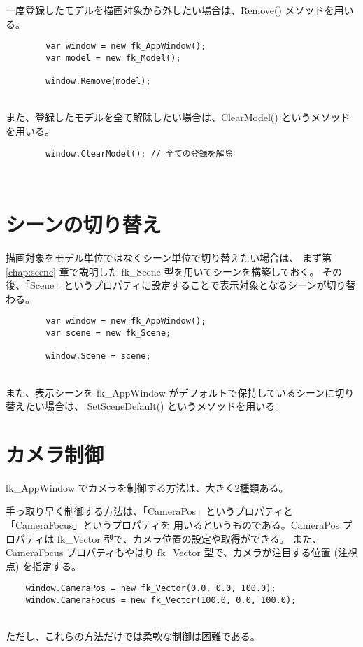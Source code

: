 一度登録したモデルを描画対象から外したい場合は、Remove() メソッドを用いる。
\\
\begin{breakbox}
\begin{verbatim}
        var window = new fk_AppWindow();
        var model = new fk_Model();

        window.Remove(model);
\end{verbatim}
\end{breakbox}
~ \\
また、登録したモデルを全て解除したい場合は、ClearModel() というメソッドを用いる。
\\
\begin{breakbox}
\begin{verbatim}
        window.ClearModel(); // 全ての登録を解除
\end{verbatim}
\end{breakbox}
~ \\

\section{シーンの切り替え}
描画対象をモデル単位ではなくシーン単位で切り替えたい場合は、
まず第 \ref{chap:scene} 章で説明した fk\_Scene 型を用いてシーンを構築しておく。
その後、「Scene」というプロパティに設定することで表示対象となるシーンが切り替わる。
\\
\begin{breakbox}
\begin{verbatim}
        var window = new fk_AppWindow();
        var scene = new fk_Scene;

        window.Scene = scene;
\end{verbatim}
\end{breakbox}
~ \\
また、表示シーンを fk\_AppWindow がデフォルトで保持しているシーンに切り替えたい場合は、
SetSceneDefault() というメソッドを用いる。

\section{カメラ制御}
fk\_AppWindow でカメラを制御する方法は、大きく2種類ある。

手っ取り早く制御する方法は、「CameraPos」というプロパティと「CameraFocus」というプロパティを
用いるというものである。CameraPos プロパティは fk\_Vector 型で、カメラ位置の設定や取得ができる。
また、CameraFocus プロパティもやはり fk\_Vector 型で、カメラが注目する位置 (注視点) を指定する。
\\
\begin{screen}
\begin{verbatim}
    window.CameraPos = new fk_Vector(0.0, 0.0, 100.0);
    window.CameraFocus = new fk_Vector(100.0, 0.0, 100.0);
\end{verbatim}
\end{screen}
~ \\
ただし、これらの方法だけでは柔軟な制御は困難である。

